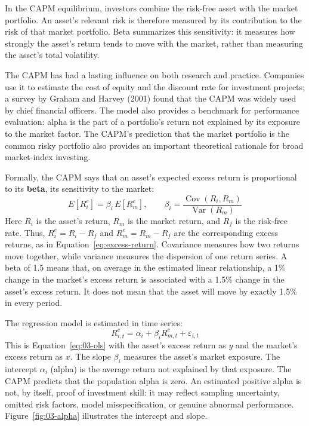 In the CAPM equilibrium, investors combine the risk-free asset with the market portfolio. An asset's relevant risk is therefore measured by its contribution to the risk of that market portfolio. Beta summarizes this sensitivity: it measures how strongly the asset's return tends to move with the market, rather than measuring the asset's total volatility.


The CAPM has had a lasting influence on both research and practice. Companies use it to estimate the cost of equity and the discount rate for investment projects; a survey by Graham and Harvey (2001) found that the CAPM was widely used by chief financial officers. The model also provides a benchmark for performance evaluation: alpha is the part of a portfolio's return not explained by its exposure to the market factor. The CAPM's prediction that the market portfolio is the common risky portfolio also provides an important theoretical rationale for broad market-index investing.

Formally, the CAPM says that an asset's expected excess return is proportional to its \textbf{beta}, its sensitivity to the market:
\begin{equation}
  E[R^{e}_{i}] = \beta_i \, E[R^{e}_{m}], \qquad \beta_i = \frac{\operatorname{Cov}(R_i, R_m)}{\operatorname{Var}(R_m)}
  \label{eq:03-capm}
\end{equation}
Here $R_i$ is the asset's return, $R_m$ is the market return, and $R_f$ is the risk-free rate. Thus, $R^{e}_{i}=R_i-R_f$ and $R^{e}_{m}=R_m-R_f$ are the corresponding excess returns, as in Equation~\eqref{eq:excess-return}. Covariance measures how two returns move together, while variance measures the dispersion of one return series. A beta of 1.5 means that, on average in the estimated linear relationship, a 1\% change in the market's excess return is associated with a 1.5\% change in the asset's excess return. It does not mean that the asset will move by exactly 1.5\% in every period.

The regression model is estimated in time series:
\begin{equation}
  R^{e}_{i,t} = \alpha_i + \beta_i R^{e}_{m,t} + \varepsilon_{i,t}
  \label{eq:03-capm-ts}
\end{equation}
This is Equation~\eqref{eq:03-ols} with the asset's excess return as $y$ and the market's excess return as $x$. The slope $\beta_i$ measures the asset's market exposure. The intercept $\alpha_i$ (alpha) is the average return not explained by that exposure. The CAPM predicts that the population alpha is zero. An estimated positive alpha is not, by itself, proof of investment skill: it may reflect sampling uncertainty, omitted risk factors, model misspecification, or genuine abnormal performance. Figure~\ref{fig:03-alpha} illustrates the intercept and slope.

